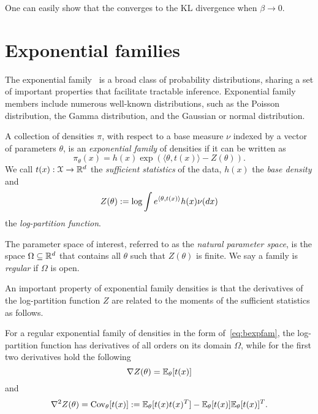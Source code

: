 One can easily show that the \bdiv{} converges to the KL divergence when $\beta \rightarrow 0$.

\section{Exponential families}
\label{sec:b-expfam}

The exponential family~\citep{wainwright08} is a broad class of probability distributions, sharing a set of important properties that facilitate tractable inference. Exponential family members include numerous well-known distributions, such as the Poisson distribution, the Gamma distribution, and the Gaussian or normal distribution. 

\begin{ndefn} \label{def:bexpfam}
	A collection of densities $\pi$, with respect to a base measure $\nu$ indexed by a vector of parameters $\theta$, is an \emph{exponential family} of densities if it can be written as
	\[
	\pi_{\theta}(x) = h(x) \exp\left( \langle \theta, t(x) \rangle - Z(\theta) \right).
	\label{eq:bexpfam}
	\]
	We call $t(x): \mathcal{X} \rightarrow \mathbb{R}^{d}$ the \emph{sufficient statistics} of the data, $h(x)$ the \emph{base density} and 
	\[
	Z(\theta):= \log \int e^{\langle \theta, t(x) \rangle } h(x) \nu(dx)
	\label{eq:b-logpartition}
	\]
	the \emph{log-partition function}.
\end{ndefn}

The parameter space of interest, referred to as the \emph{natural parameter space}, is the space $\Omega \subseteq \mathbb{R}^d $ that contains all $\theta$ such that $Z(\theta)$ is finite. We say a family is \emph{regular} if $\Omega$ is open.

An important property of exponential family densities is that the derivatives of the log-partition function $Z$ are related to the moments of the sufficient statistics as follows.

\begin{nprop} \label{prop:bgradZ}
	For a regular exponential family of densities in the form of~\cref{eq:bexpfam}, the log-partition function has derivatives of all orders on its domain $\Omega$, while for the first two derivatives hold the following
	\[
	\nabla Z(\theta) = \mathbb{E}_{\theta}[t(x)]
	\label{eq:bgradZ}
	\] 	
	and 
	\[
	\nabla^2Z(\theta) = \operatorname{Cov}_{\theta}[t(x)] := \mathbb{E}_{\theta}[t(x)t(x)^T] - \mathbb{E}_{\theta}[t(x)]\mathbb{E}_{\theta}[t(x)]^T.
	\label{eq:bhessZ}
	\]
\end{nprop}

